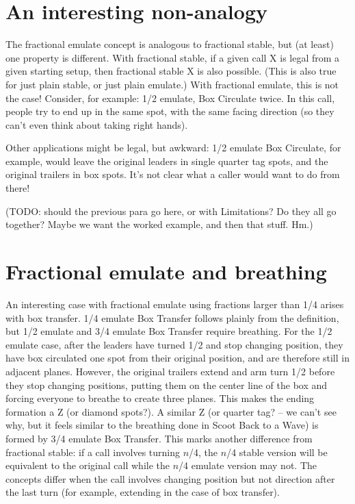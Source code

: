 \documentclass[11pt]{article}
\begin{document}
\section{An interesting non-analogy}
\label{sec:nonanalogy}

The fractional emulate concept is analogous to fractional stable,
but (at least) one property is different.
With fractional stable,
if a given call X is legal from a given starting setup,
then fractional stable X is also possible.
(This is also true for just plain stable, or just plain emulate.)
With fractional emulate, this is not the case!
Consider, for example: 1/2 emulate, Box Circulate twice.
In this call, people try to end up in the same spot,
with the same facing direction
(so they can't even think about taking right hands).

Other applications might be legal, but awkward:
1/2 emulate Box Circulate, for example,
would leave the original leaders in single quarter tag spots,
and the original trailers in box spots.
It's not clear what a caller would want to do from there!

(TODO: should the previous para go here, or with Limitations?
Do they all go together?  Maybe we want the worked example,
and then that stuff.  Hm.)

\section{Fractional emulate and breathing}

An interesting case with fractional emulate using fractions larger
than 1/4 arises with box transfer. 1/4 emulate Box Transfer
follows plainly from the definition,
but 1/2 emulate and 3/4 emulate
Box Transfer require breathing. For the 1/2 emulate case, after the leaders
have turned 1/2 and stop changing position, they have box circulated
one spot from their original position, and are therefore still in
adjacent planes. However, the original trailers extend and arm turn 1/2
before they stop changing positions, putting them on the center line
of the box and forcing everyone to breathe to create three planes.
This makes the ending formation a Z (or diamond spots?).
A similar Z (or quarter tag? -- we can't see why, but it feels similar
to the breathing done in Scoot Back to a Wave) is formed by
3/4 emulate Box Transfer. This marks another difference from
fractional stable: if a call involves turning $n$/4, the $n$/4 stable
version will be equivalent to the original call while the $n$/4
emulate version may not. The concepts differ when the call involves
changing position but not direction after the last turn (for example,
extending in the case of box transfer).
\end{document}
